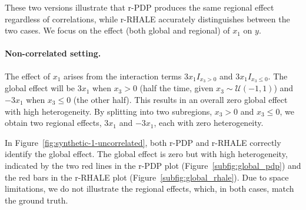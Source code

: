 \documentclass[
twocolumn,
]{ceurart}
\begin{document}
These two versions illustrate that r-PDP produces the same regional effect regardless of correlations, while r-RHALE accurately distinguishes between the two cases. We focus on the effect (both global and regional) of \( x_1 \) on \( y \).

\paragraph{Non-correlated setting.}

The effect of \( x_1 \) arises from the interaction terms \( 3x_1I_{x_3>0} \) and \( 3x_1I_{x_3\leq0} \). The global effect will be \( 3x_1 \) when \( x_3 > 0 \) (half the time, given \( x_3 \sim \mathcal{U}(-1,1) \)) and \( -3x_1 \) when \( x_3 \leq 0 \) (the other half). This results in an overall zero global effect with high heterogeneity. By splitting into two subregions, \( x_3 > 0 \) and \( x_3 \leq 0 \), we obtain two regional effects, \( 3x_1 \) and \( -3x_1 \), each with zero heterogeneity.

In Figure~\ref{fig:synthetic-1-uncorrelated}, both r-PDP and r-RHALE correctly identify the global effect. The global effect is zero but with high heterogeneity, indicated by the two red lines in the r-PDP plot (Figure~\ref{subfig:global_pdp}) and the red bars in the r-RHALE plot (Figure~\ref{subfig:global_rhale}). Due to space limitations, we do not illustrate the regional effects, which, in both cases, match the ground truth.
\end{document}
